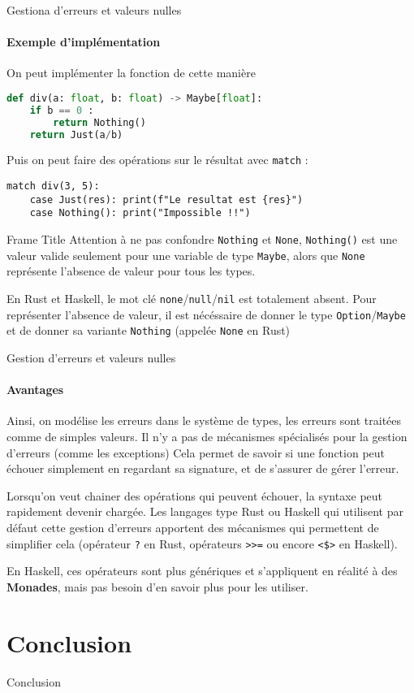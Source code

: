 \documentclass[aspectratio=169]{beamer}
\begin{document}
\begin{frame}[fragile]{Gestiona d'erreurs et valeurs nulles}
    \framesubtitle{Exemple d'implémentation}
    On peut implémenter la fonction de cette manière
    \begin{lstlisting}[language=Python]
def div(a: float, b: float) -> Maybe[float]:
    if b == 0 :
        return Nothing()
    return Just(a/b)
    \end{lstlisting}

    Puis on peut faire des opérations sur le résultat avec \verb|match| :

    \begin{lstlisting}
match div(3, 5):
    case Just(res): print(f"Le resultat est {res}")
    case Nothing(): print("Impossible !!")
    \end{lstlisting}


\end{frame}

\begin{frame}[fragile]{Frame Title}
    Attention à ne pas confondre \verb|Nothing| et \verb|None|, \verb|Nothing()| est une valeur valide seulement pour une variable de type \verb|Maybe|, alors que \verb|None| représente l'absence de valeur pour tous les types.

    En Rust et Haskell, le mot clé \verb|none|/\verb|null|/\verb|nil| est totalement absent. Pour représenter l'absence de valeur, il est nécéssaire de donner le type \verb|Option|/\verb|Maybe| et de donner sa variante \verb|Nothing| (appelée \verb|None| en Rust)
\end{frame}

\begin{frame}[fragile]{Gestion d'erreurs et valeurs nulles}
    \framesubtitle{Avantages}
    Ainsi, on modélise les erreurs dans le système de types, les erreurs sont traitées comme de simples valeurs. Il n'y a pas de mécanismes spécialisés pour la gestion d'erreurs (comme les exceptions)
    Cela permet de savoir si une fonction peut échouer simplement en regardant sa signature, et de s'assurer de gérer l'erreur.

    Lorsqu'on veut chainer des opérations qui peuvent échouer, la syntaxe peut rapidement devenir chargée. Les langages type Rust ou Haskell qui utilisent par défaut cette gestion d'erreurs apportent des mécanismes qui permettent de simplifier cela (opérateur \verb|?| en Rust, opérateurs \verb|>>=| ou encore \verb|<$>| en Haskell).

    En Haskell, ces opérateurs sont plus génériques et s'appliquent en réalité à des \textbf{Monades}, mais pas besoin d'en savoir plus pour les utiliser.
\end{frame}

\section{Conclusion}

\begin{frame}{Conclusion}
    
\end{frame}
\end{document}
